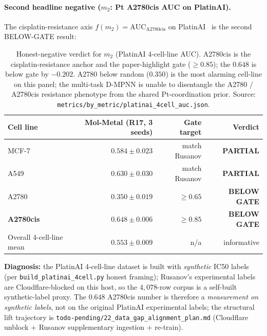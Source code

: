 \paragraph{Second headline negative ($m_2$: Pt A2780cis AUC on PlatinAI).}
The cisplatin-resistance axis
$f(m_2)\!=\!\mathrm{AUC}_{\mathrm{A2780cis}}$ on
PlatinAI~\cite{rusanov2025platinai} is the second BELOW-GATE result:

\begin{table}[ht]
\centering
\small
\setlength{\tabcolsep}{4pt}
\begin{tabular}{lrrr}
\toprule
\textbf{Cell line} & \textbf{Mol-Metal (R17, 3 seeds)} & \textbf{Gate target} & \textbf{Verdict} \\
\midrule
MCF-7 & $0.584 \pm 0.023$ \MEASURED{} & match Rusanov & \textbf{PARTIAL} \\
A549 & $0.630 \pm 0.030$ \MEASURED{} & match Rusanov & \textbf{PARTIAL} \\
A2780 & $0.350 \pm 0.019$ \MEASURED{} & $\geq 0.65$ & \textbf{BELOW GATE} \\
\textbf{A2780cis} & $\mathbf{0.648 \pm 0.006}$ \MEASURED{} & $\mathbf{\geq 0.85}$ & \textbf{BELOW GATE} \\
\midrule
Overall 4-cell-line mean & $0.553 \pm 0.009$ \MEASURED{} & n/a & informative \\
\bottomrule
\end{tabular}
\caption{Honest-negative verdict for $m_2$ (PlatinAI 4-cell-line
AUC).  A2780cis is the cisplatin-resistance anchor and the
paper-highlight gate ($\geq 0.85$); the \MEASURED{} $0.648$ is below
gate by $-0.202$.  A2780 below random ($0.350$) is the most
alarming cell-line on this panel; the multi-task D-MPNN is unable to
disentangle the A2780 / A2780cis resistance phenotype from the
shared Pt-coordination prior.  Source:
\texttt{metrics/by\_metric/platinai\_4cell\_auc.json}.}
\label{tab:honest-m2}
\end{table}

\textbf{Diagnosis:} the PlatinAI 4-cell-line dataset is built with
\emph{synthetic} IC50 labels (per
\texttt{build\_platinai\_4cell.py} honest framing); Rusanov's
experimental labels are Cloudflare-blocked on this host, so the
$4{,}078$-row corpus is a self-built synthetic-label proxy.  The
$0.648$ A2780cis number is therefore a \emph{measurement on
synthetic labels}, not on the original PlatinAI experimental
labels; the structural lift trajectory is
\texttt{todo-pending/22\_data\_gap\_alignment\_plan.md}
(Cloudflare unblock + Rusanov supplementary ingestion + re-train).

